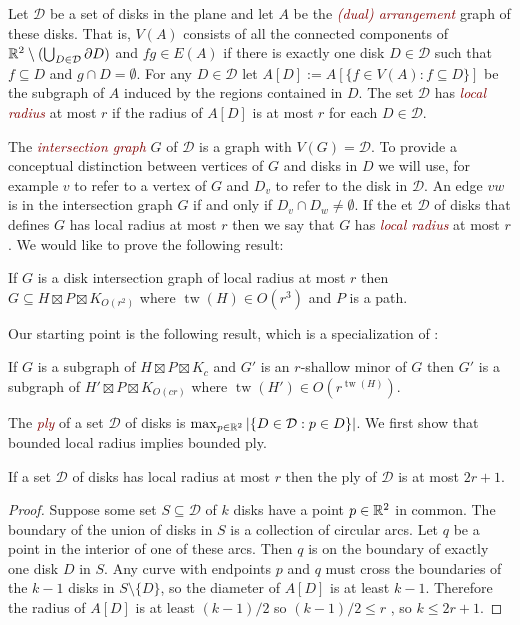 \documentclass{patmorin}
\newcommand{\defin}[1]{\textcolor{Maroon}{\emph{#1}}}
\DeclareMathOperator{\tw}{tw}
\begin{document}
Let $\mathcal{D}$ be a set of disks in the plane and let $A$ be the \defin{(dual) arrangement} graph of these disks.  That is, $V(A)$ consists of all the connected components of $\mathbb{R}^2\setminus(\bigcup_{D\in\mathcal{D}}\partial D)$ and $fg\in E(A)$ if there is exactly one disk $D\in\mathcal{D}$ such that $f\subseteq D$ and $g\cap D=\emptyset$.  For any $D\in\mathcal{D}$ let $A[D]:=A[\{f\in V(A): f\subseteq D\}]$ be the subgraph of $A$ induced by the regions contained in $D$.  The set $\mathcal{D}$ has \defin{local radius} at most $r$ if the radius of $A[D]$ is at most $r$ for each $D\in\mathcal{D}$.

The \defin{intersection graph} $G$ of $\mathcal{D}$ is a graph with $V(G)=\mathcal{D}$. To provide a conceptual distinction between vertices of $G$ and disks in $D$ we will use, for example $v$ to refer to a vertex of $G$ and $D_v$ to refer to the disk in $\mathcal{D}$.  An edge $vw$ is in the intersection graph $G$ if and only if $D_v\cap D_w\neq\emptyset$.  If the et $\mathcal{D}$ of disks that defines $G$ has local radius at most $r$ then we say that $G$ has \defin{local radius} at most $r$.  We would like to prove the following result:

\begin{thm}\label{radius_product}
   If $G$ is a disk intersection graph of local radius at most $r$ then  $G\subseteq H\boxtimes P\boxtimes K_{O(r^2)}$ where $\tw(H)\in O(r^3)$ and $P$ is a path.
\end{thm}

Our starting point is the following result, which is a specialization of \citet[Theorem~7]{hickingbotham.wood:shallow}:

\begin{thm}\label{h_w_shallow_minor}
  If $G$ is a subgraph of $H\boxtimes P\boxtimes K_c$ and $G'$ is an $r$-shallow minor of $G$ then $G'$ is a subgraph of $H' \boxtimes P \boxtimes K_{O(cr)}$ where $\tw(H') \in O(r^{\tw(H)})$.
\end{thm}

The \defin{ply} of a set $\mathcal{D}$ of disks is $\max_{p\in\mathbb{R}^2}|\{D\in\mathcal{D}:p\in D\}|$.  We first show that bounded local radius implies bounded ply.

\begin{lem}\label{ply}
  If a set $\mathcal{D}$ of disks has local radius at most $r$ then the ply of $\mathcal{D}$ is at most $2r+1$.
\end{lem}

\begin{proof}
  Suppose some set $S\subseteq\mathcal{D}$ of $k$ disks have a point $p\in \mathbb{R}^2$ in common.  The boundary of the union of disks in $S$ is a collection of circular arcs.  Let $q$ be a point in the interior of one of these arcs.  Then $q$ is on the boundary of exactly one disk $D$ in $S$.  Any curve with endpoints $p$ and $q$ must cross the boundaries of the $k-1$ disks in $S \setminus \{D\}$, so the diameter of $A[D]$ is at least $k-1$.  Therefore the radius of $A[D]$ is at least $(k-1)/2$ so $(k - 1)/2 \le r$ , so $k \le  2r+1$.
\end{proof}
\end{document}
